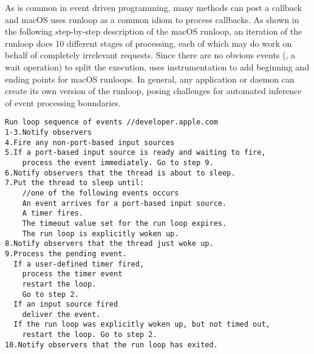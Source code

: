 As is common in event driven programming, many methods can post a callback and
macOS uses runloop as a common idiom to process callbacks.  As shown in the
following step-by-step description of the macOS runloop, an iteration of the
runloop does 10 different stages of processing, each of which may do work on
behalf of completely irrelevant requests.  Since there are no obvious events
(\eg, a wait operation) to split the execution, \xxx uses instrumentation to
add beginning and ending points for macOS runloops.  In general, any
application or daemon can create its own version of the runloop, posing
challenges for automated inference of event processing boundaries.

{\footnotesize \begin{verbatim}
Run loop sequence of events //developer.apple.com
1-3.Notify observers
4.Fire any non-port-based input sources
5.If a port-based input source is ready and waiting to fire,
    process the event immediately. Go to step 9.
6.Notify observers that the thread is about to sleep.
7.Put the thread to sleep until:
    //one of the following events occurs
    An event arrives for a port-based input source.
    A timer fires.
    The timeout value set for the run loop expires.
    The run loop is explicitly woken up.
8.Notify observers that the thread just woke up.
9.Process the pending event.
  If a user-defined timer fired,
    process the timer event
    restart the loop.
    Go to step 2.
  If an input source fired
    deliver the event.
  If the run loop was explicitly woken up, but not timed out,
    restart the loop. Go to step 2.
10.Notify observers that the run loop has exited.

\end{verbatim}
}




